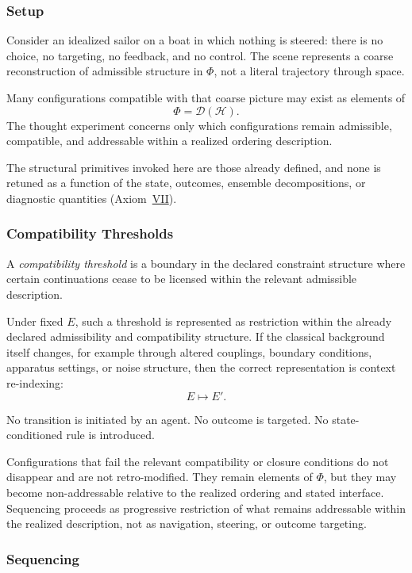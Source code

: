 \documentclass[aps,prx,onecolumn,11pt]{revtex4-2}
\theoremstyle{plain}
\theoremstyle{definition}
\theoremstyle{remark}
\begin{document}
\subsubsection{Setup}

Consider an idealized sailor on a boat in which nothing is steered:
there is no choice, no targeting, no feedback, and no control. The
scene represents a coarse reconstruction of admissible structure in
\(\Phi\), not a literal trajectory through space.

Many configurations compatible with that coarse picture may exist as
elements of
\[
\Phi=\mathcal D(\mathcal H).
\]
The thought experiment concerns only which configurations remain
admissible, compatible, and addressable within a realized ordering
description.

The structural primitives invoked here are those already defined, and
none is retuned as a function of the state, outcomes, ensemble
decompositions, or diagnostic quantities
(Axiom~\hyperref[ax:NS1]{VII}).

\subsubsection{Compatibility Thresholds}

A \emph{compatibility threshold} is a boundary in the declared
constraint structure where certain continuations cease to be licensed
within the relevant admissible description.

Under fixed \(E\), such a threshold is represented as restriction within
the already declared admissibility and compatibility structure. If the
classical background itself changes, for example through altered
couplings, boundary conditions, apparatus settings, or noise structure,
then the correct representation is context re-indexing:
\[
E\mapsto E'.
\]

No transition is initiated by an agent. No outcome is targeted. No
state-conditioned rule is introduced.

Configurations that fail the relevant compatibility or closure
conditions do not disappear and are not retro-modified. They remain
elements of \(\Phi\), but they may become non-addressable relative to
the realized ordering and stated interface. Sequencing proceeds as
progressive restriction of what remains addressable within the realized
description, not as navigation, steering, or outcome targeting.

\subsubsection{Sequencing}
\end{document}
